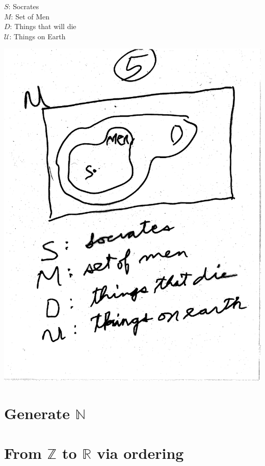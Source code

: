 \documentclass[10pt,a4paper]{article}
\begin{document}
$S$: Socrates\\
$M$: Set of Men\\
$D$: Things that will die\\
$\mathcal{U}$: Things on Earth

\includegraphics[scale=.5]{Pages/ST_5} 







\section{Generate $\mathbb{N}$}






\section{From $\mathbb{Z}$ to $\mathbb{R}$ via ordering}
\end{document}
